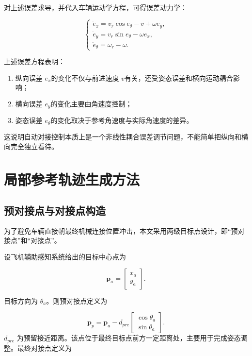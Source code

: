 对上述误差求导，并代入车辆运动学方程，可得误差动力学：

\begin{equation}
\begin{cases}
\dot{e}_x=v_r\cos e_\theta-v+\omega e_y,\\
\dot{e}_y=v_r\sin e_\theta-\omega e_x,\\
\dot{e}_\theta=\omega_r-\omega.
\end{cases}
\label{eq:error_dynamics}
\end{equation}

上述误差方程表明：

\begin{enumerate}[label=（\arabic*）,leftmargin=4em]
\def\labelenumi{\arabic{enumi}.}
\item
  纵向误差 \(e_{x}\)的变化不仅与前进速度
  \(v\)有关，还受姿态误差和横向运动耦合影响；
\item
  横向误差 \(e_{y}\)的变化主要由角速度控制；
\item
  姿态误差 \(e_{\theta}\)的变化取决于参考角速度与实际角速度的差异。
\end{enumerate}

这说明自动对接控制本质上是一个非线性耦合误差调节问题，不能简单把纵向和横向完全独立看待\cite{ref19,ref27,ref28}。

\section{局部参考轨迹生成方法}

\subsection{预对接点与对接点构造}

为了避免车辆直接朝最终机械连接位置冲击，本文采用两级目标点设计，即``预对接点''和``对接点''。

设飞机辅助感知系统给出的目标中心点为

\begin{equation}
\mathbf{p}_a=\begin{bmatrix}x_a\\y_a\end{bmatrix}.
\label{eq:target_point}
\end{equation}

目标方向为 \(\theta_{a}\)。则预对接点定义为

\begin{equation}
\mathbf{p}_{p}=\mathbf{p}_{a}-d_{pre}
\begin{bmatrix}\cos\theta_a\\\sin\theta_a\end{bmatrix}.
\label{eq:pre_docking_point}
\end{equation}
\(d_{pre}\)
为预留接近距离。该点位于最终目标点前方一定距离处，主要用于完成姿态调整。最终对接点定义为

